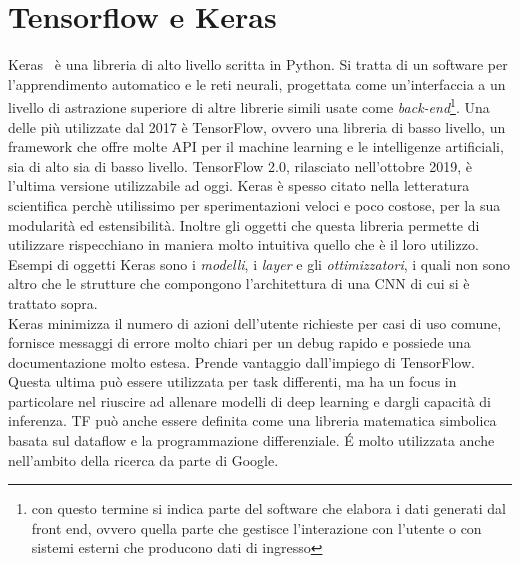 \section{Tensorflow e Keras}
Keras ~\cite{keras,tf}è una libreria di alto livello scritta in Python. Si tratta di un software per l'apprendimento automatico e le reti neurali, progettata come
 un'interfaccia a un livello di astrazione superiore di altre librerie simili usate come \emph{back-end}\footnote{con questo termine si indica parte
  del software che elabora i dati generati dal front end, ovvero quella parte che gestisce 
  l'interazione con l'utente o con sistemi esterni che producono dati di ingresso}.
  Una delle più utilizzate dal 2017 è TensorFlow, ovvero una libreria di basso livello,
   un framework che offre molte API per il machine learning e le intelligenze artificiali,
    sia di alto sia di basso livello.
  TensorFlow 2.0, rilasciato nell'ottobre 2019, è l'ultima versione utilizzabile ad oggi.
  Keras è spesso citato nella letteratura scientifica perchè utilissimo per sperimentazioni veloci e poco costose, per la sua modularità ed estensibilità.
Inoltre gli oggetti che questa libreria permette di utilizzare rispecchiano in maniera 
molto intuitiva quello
che è il loro utilizzo. Esempi di oggetti Keras sono i \emph{modelli}, i \emph{layer} e gli 
\emph{ottimizzatori}, i quali non sono altro
che le strutture che compongono l'architettura di una CNN di cui si è trattato sopra.\\
Keras minimizza il numero di azioni dell'utente richieste per casi di uso comune,
fornisce messaggi di errore molto chiari per un debug rapido e possiede una documentazione molto estesa.
Prende vantaggio dall'impiego di TensorFlow. Questa ultima può essere utilizzata per task differenti, ma 
ha un focus in particolare nel riuscire ad allenare modelli di deep learning e dargli capacità di inferenza.
TF può anche essere definita come una libreria matematica simbolica basata sul dataflow e la programmazione differenziale.
É molto utilizzata anche nell'ambito della ricerca da parte di Google.\\

